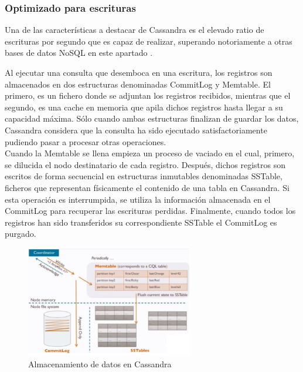 \subsubsection{Optimizado para escrituras}

Una de las características a destacar de Cassandra es el elevado ratio de escrituras por segundo que es capaz de realizar, superando notoriamente a otras bases de datos NoSQL en este apartado \cite{rabl2012solving}.

Al ejecutar una consulta que desemboca en una escritura, los registros son almacenados en dos estructuras denominadas CommitLog y Memtable. El primero, es un fichero donde se adjuntan los registros recibidos, mientras que el segundo, es una cache en memoria que apila dichos registros hasta llegar a su capacidad máxima. Sólo cuando ambas estructuras finalizan de guardar los datos, Cassandra considera que la consulta ha sido ejecutado satisfactoriamente pudiendo pasar a procesar otras operaciones.\\

Cuando la Memtable se llena empieza un proceso de vaciado en el cual, primero, se dilucida el nodo destinatario de cada registro. Después, dichos registros son escritos de forma secuencial en estructuras inmutables denominadas SSTable, ficheros que representan físicamente el contenido de una tabla en Cassandra. Si esta operación es interrumpida, se utiliza la información almacenada en el CommitLog para recuperar las escrituras perdidas. Finalmente, cuando todos los registros han sido transferidos su correspondiente SSTable el CommitLog es purgado.\\

\begin{figure}[h]
	\centering
	\includegraphics[width=0.65\textwidth]{Ilustraciones/cassandra_data_storage.png}
	\caption{Almacenamiento de datos en Cassandra}
	\label{fig:almacenamiento_cassandra}
\end{figure}

